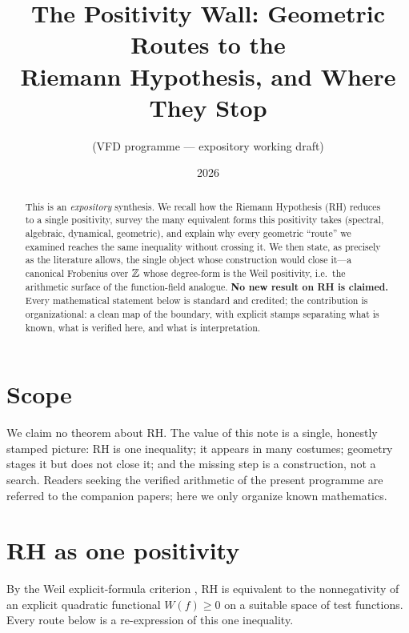 \documentclass[11pt]{article}
\title{The Positivity Wall: Geometric Routes to the\\ Riemann Hypothesis, and Where
They Stop}
\author{(VFD programme --- expository working draft)}
\date{2026}
\begin{document}
\maketitle

\begin{abstract}
This is an \emph{expository} synthesis. We recall how the Riemann Hypothesis (RH)
reduces to a single positivity, survey the many equivalent forms this positivity
takes (spectral, algebraic, dynamical, geometric), and explain why every geometric
``route'' we examined reaches the same inequality without crossing it. We then state,
as precisely as the literature allows, the single object whose construction would
close it---a canonical Frobenius over $\mathbb{Z}$ whose degree-form is the Weil positivity,
i.e.\ the arithmetic surface of the function-field analogue. \textbf{No new result on
RH is claimed.} Every mathematical statement below is standard and credited; the
contribution is organizational: a clean map of the boundary, with explicit stamps
separating what is known, what is verified here, and what is interpretation.
\end{abstract}

\section{Scope}
We claim no theorem about RH. The value of this note is a single, honestly stamped
picture: RH is one inequality; it appears in many costumes; geometry stages it but
does not close it; and the missing step is a construction, not a search. Readers
seeking the verified arithmetic of the present programme are referred to the
companion papers; here we only organize known mathematics.

\section{RH as one positivity}
By the Weil explicit-formula criterion \cite{Weil}, RH is equivalent to the
nonnegativity of an explicit quadratic functional $W(f)\ge 0$ on a suitable space of
test functions. Every route below is a re-expression of this one inequality.
\end{document}
